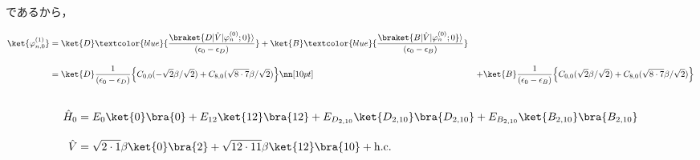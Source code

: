 であるから，

\begin{align}
    \ket{\varphi_{n,0}^{(1)}}
    &=
    \ket{D}
    \textcolor{blue}{
    \frac{\braket{D|\hat{V}|\varphi^{(0)}_n;0}\rangle}{(\epsilon_{0}-\epsilon_D)}}
    +
    \ket{B}
    \textcolor{blue}{
    \frac{\braket{B|\hat{V}|\varphi^{(0)}_n;0}\rangle}{(\epsilon_0-\epsilon_B)}}\\[10pt]
    &=\ket{D}
    \frac{1}{(\epsilon_{0}-\epsilon_D)}
    \Bigl\{C_{0,0}(-\sqrt{2}\beta/\sqrt{2}) + C_{8,0} (\sqrt{8\cdot7}\beta/\sqrt{2})\Bigr\}\nn[10pt]
    &+
    \ket{B}
    \frac{1}{(\epsilon_{0}-\epsilon_B)}
    \Bigl\{C_{0,0}(\sqrt{2}\beta/\sqrt{2}) + C_{8,0} (\sqrt{8\cdot7}\beta/\sqrt{2})\Bigr\}
\end{align}


\subsection*{}

\begin{align}
    \hat{H}_0 &= E_{0}\ket{0}\bra{0} + E_{12} \ket{12}\bra{12} 
    + E_{D_{2,10}} \ket{D_{2,10}}\bra{D_{2,10}}
    + E_{B_{2,10}} \ket{B_{2,10}}\bra{B_{2,10}}\\[10pt]
    \hat{V}&= \sqrt{2\cdot1}\beta\ket{0}\bra{2} + \sqrt{12\cdot11}\beta\ket{12}\bra{10} + {\rm{h.c.}}
\end{align}


